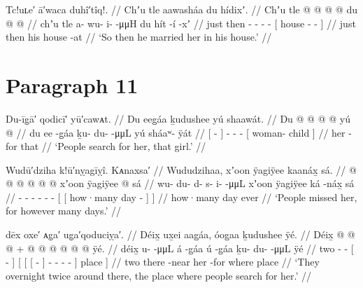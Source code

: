 \ex\label{ex:89-171-he-married-her}%
%
\begingl
	\glpreamble	Tc!uʟe′ ā′waca duhî′tîq!. //
	\glpreamble	Chʼu tle aawasháa du hídixʼ. //
	\gla	Chʼu tle  @ {} @ {} @ {} @ {}
		{} du  @ {} @ {} {} //
	\glb	chʼu tle a- wu- i-  -μμH
		{} du hít -í -xʼ {} //
	\glc	just then - - -  -
		{}[  house - - {}] //
	\gld	just then  {} {} {} {}
		{} his house {} -at {} //
	\glft	‘So then he married her in his house.’
		//
\endgl
\xe

\section{Paragraph 11}\label{sec:89-para-11}

\ex\label{ex:89-172-ppl-search-for-her}%
%
\begingl
	\glpreamble	Du-īg̣ā′ qodicī′ yū′cawᴀt. //
	\glpreamble	Du eeg̱áa ḵudushee yú shaawát. //
	\gla	{} Du  @ {} {}
		 @ {} @ {} @ {}
		{} yú  @ {} {} //
	\glb	{} du ee -g̱áa {}
		ḵu- du-  -μμL
		{} yú sháaʷ- ÿát {} //
	\glc	{}[   - {}]
		- -  -
		{}[  woman- child {}] //
	\gld	{} her {} -for {}
		 {} {} {}
		{} that  {} {} //
	\glft	‘People search for her, that girl.’
		//
\endgl
\xe

\ex\label{ex:89-173-ppl-missed-her-some-days}%
%
\begingl
	\glpreamble	Wudū′dziha k!ū′nỵagīỵî.
Kᴀnaxsa′ //
	\glpreamble	Wududzihaa, xʼoon ÿagiÿee kaanáx̱ sá. //
	\gla	{} @ {} @ {} @ {} @ {} @ {} @ {}
		{} {} xʼoon ÿagiÿee  @ {} {} sá {} //
	\glb	wu- du- d- s- i-  -μμL
		{} {} xʼoon ÿagiÿee ká -náx̱ {} sá {} //
	\glc	{}- - - - -  -
		{}[ {}[ how·many day  - {}]  {}] //
	\gld	{} {} {} {} {} {} {}
		{} {} how·many day  {} {} ever {} //
	\glft	‘People missed her, for however many days.’
		//
\endgl
\xe

\ex\label{ex:89-174-two-overnight-place-search-for-her}%
%
\begingl
	\glpreamble	dēx oxe′ ᴀg̣a′ ug̣a′qoduciỵa′. //
	\glpreamble	Déix̱ ux̱ei aag̱áa, óog̱aa ḵudushee ÿé. //
	\gla	Déix̱  @ {} @ {}
		{}  @ {} {} +
		{} {} {}  @ {} {}
			 @ {} @ {} @ {} @ {} @ {} {} ÿé. {} //
	\glb	déix̱ u-  -μμL
		{} á -g̱áa {}
		{} {} {} ú -g̱áa {}
			ḵu- du- {}  -μμL {} {} ÿé {} //
	\glc	two -  -
		{}[  - {}]
		{}[ {}[ {}[  - {}]
			- - -  - \· {}] place {}] //
	\gld	two  {} {}
		{} there -near {}
		{} {} {} her -for {}
			 {} {} {} {} \·where {} place {} //
	\glft	‘They overnight twice around there, the place where people search for her.’
		//
\endgl
\xe

